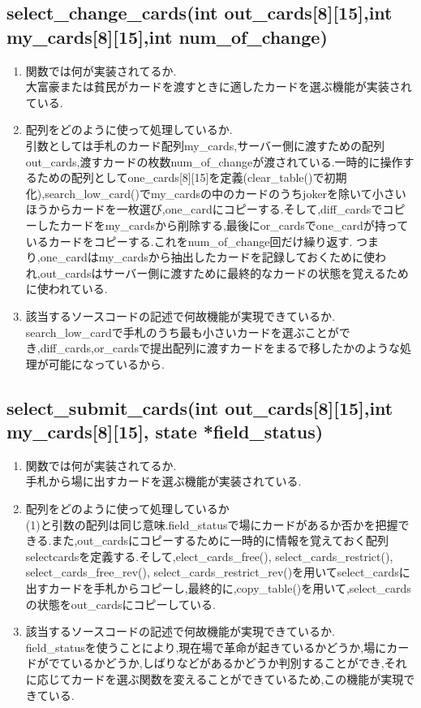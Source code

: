 \documentclass{jsarticle}
\begin{document}
\subsection{select\_change\_cards(int out\_cards[8][15],int my\_cards[8][15],int num\_of\_change)}
\begin{enumerate}
  \item  関数では何が実装されてるか.\\
  大富豪または貧民がカードを渡すときに適したカードを選ぶ機能が実装されている.
  \item 配列をどのように使って処理しているか.\\
  引数としては手札のカード配列my\_cards,サーバー側に渡すための配列out\_cards,渡すカードの枚数num\_of\_changeが渡されている.一時的に操作するための配列としてone\_cards[8][15]を定義(clear\_table()で初期化),search\_low\_card()でmy\_cardsの中のカードのうちjokerを除いて小さいほうからカードを一枚選び,one\_cardにコピーする.そして,diff\_cardsでコピーしたカードをmy\_cardsから削除する,最後にor\_cardsでone\_cardが持っているカードをコピーする.これをnum\_of\_change回だけ繰り返す.
  つまり,one\_cardはmy\_cardsから抽出したカードを記録しておくために使われ,out\_cardsはサーバー側に渡すために最終的なカードの状態を覚えるために使われている.
  \item 該当するソースコードの記述で何故機能が実現できているか.\\
  search\_low\_cardで手札のうち最も小さいカードを選ぶことができ,diff\_cards,or\_cardsで提出配列に渡すカードをまるで移したかのような処理が可能になっているから.

\end{enumerate}

\subsection{select\_submit\_cards(int out\_cards[8][15],int my\_cards[8][15], state *field\_status)}

\begin{enumerate}
  \item 関数では何が実装されてるか.\\
  手札から場に出すカードを選ぶ機能が実装されている.
  \item  配列をどのように使って処理しているか\\
  (1)と引数の配列は同じ意味.field\_statusで場にカードがあるか否かを把握できる.また,out\_cardsにコピーするために一時的に情報を覚えておく配列selectcardsを定義する.そして,elect\_cards\_free(), select\_cards\_restrict(), select\_cards\_free\_rev(), select\_cards\_restrict\_rev()を用いてselect\_cardsに出すカードを手札からコピーし,最終的に,copy\_table()を用いて,select\_cardsの状態をout\_cardsにコピーしている.
  \item  該当するソースコードの記述で何故機能が実現できているか.\\
  field\_statusを使うことにより,現在場で革命が起きているかどうか,場にカードがでているかどうか,しばりなどがあるかどうか判別することができ,それに応じてカードを選ぶ関数を変えることができているため,この機能が実現できている.
\end{enumerate}
\end{document}
